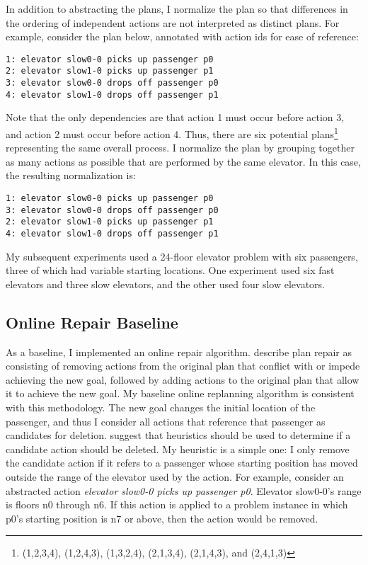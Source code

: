 In addition to abstracting the plans, I normalize the plan so that differences in the ordering of independent actions are not interpreted as distinct plans.  For example, consider the plan below, annotated with action ids for ease of reference: 

\begin{verbatim}
1: elevator slow0-0 picks up passenger p0
2: elevator slow1-0 picks up passenger p1
3: elevator slow0-0 drops off passenger p0
4: elevator slow1-0 drops off passenger p1
\end{verbatim}

Note that the only dependencies are that action 1 must occur before action 3, and action 2 must occur before action 4.  Thus, there are six potential plans\footnote{(1,2,3,4), (1,2,4,3), (1,3,2,4), (2,1,3,4), (2,1,4,3), and (2,4,1,3)} representing the same overall process.  I normalize the plan by grouping together as many actions as possible that are performed by the same elevator.  In this case, the resulting normalization is:

\begin{verbatim}
1: elevator slow0-0 picks up passenger p0
3: elevator slow0-0 drops off passenger p0
2: elevator slow1-0 picks up passenger p1
4: elevator slow1-0 drops off passenger p1
\end{verbatim}

My subsequent experiments used a 24-floor elevator problem with six passengers, three of which had variable starting locations.  One experiment used six fast elevators and three slow elevators, and the other used four slow elevators.

\subsection{Online Repair Baseline} As a baseline, I implemented an online repair algorithm.  \cite{krogt05planrepair} describe plan repair as consisting of removing actions from the original plan that conflict with or impede achieving the new goal, followed by adding actions to the original plan that allow it to achieve the new goal.  My baseline online replanning algorithm is consistent with this methodology.  The new goal changes the initial location of the passenger, and thus I consider all actions that reference that passenger as candidates for deletion.  \citeauthor{krogt05planrepair} suggest that heuristics should be used to determine if a candidate action should be deleted.  My  heuristic is a simple one: I only remove the candidate action if it refers to a passenger whose starting position has moved outside the range of the elevator used by  the action.  For example, consider an abstracted action \textit{elevator slow0-0 picks up passenger p0}. Elevator slow0-0's range is floors n0 through n6. If this action is applied to a problem instance in which p0's starting position is n7 or above, then the action would be removed.

